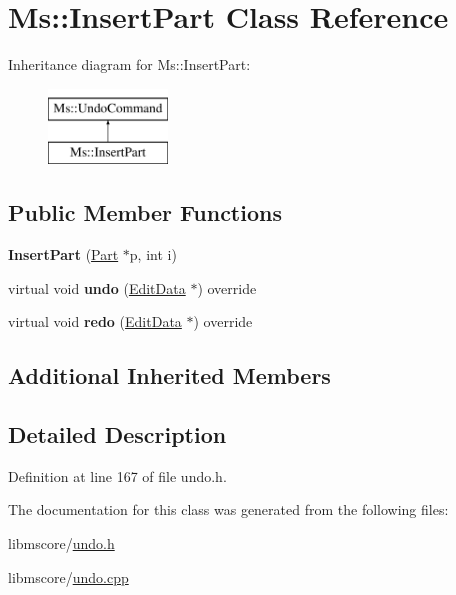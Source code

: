 \hypertarget{class_ms_1_1_insert_part}{}\section{Ms\+:\+:Insert\+Part Class Reference}
\label{class_ms_1_1_insert_part}
Inheritance diagram for Ms\+:\+:Insert\+Part\+:\begin{figure}[H]
\begin{center}
\leavevmode
\includegraphics[height=2.000000cm]{class_ms_1_1_insert_part}
\end{center}
\end{figure}
\subsection*{Public Member Functions}
\begin{DoxyCompactItemize}
\item 
\mbox{\label{class_ms_1_1_insert_part_ab7ff5af18408818ab56450a4803429d4}} 
{\bfseries Insert\+Part} (\hyperlink{class_ms_1_1_part}{Part} $\ast$p, int i)
\item 
\mbox{\label{class_ms_1_1_insert_part_ad7ed6170c9aacab26ac01f612f80dd32}} 
virtual void {\bfseries undo} (\hyperlink{class_ms_1_1_edit_data}{Edit\+Data} $\ast$) override
\item 
\mbox{\label{class_ms_1_1_insert_part_adcbf7e3aa8d3da3c7207bfbfa4bcb2a5}} 
virtual void {\bfseries redo} (\hyperlink{class_ms_1_1_edit_data}{Edit\+Data} $\ast$) override
\end{DoxyCompactItemize}
\subsection*{Additional Inherited Members}


\subsection{Detailed Description}


Definition at line 167 of file undo.\+h.



The documentation for this class was generated from the following files\+:\begin{DoxyCompactItemize}
\item 
libmscore/\hyperlink{undo_8h}{undo.\+h}\item 
libmscore/\hyperlink{undo_8cpp}{undo.\+cpp}\end{DoxyCompactItemize}
